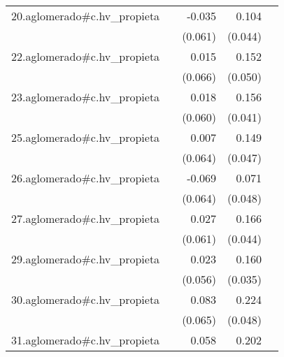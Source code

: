 {\begin{longtable}{l*{4}{D{.}{.}{-1}}}
\addlinespace
20.aglomerado#c.hv\_propieta&                     &      -0.035         &       0.104\sym{*}  &                     \\
            &                     &     (0.061)         &     (0.044)         &                     \\
\addlinespace
22.aglomerado#c.hv\_propieta&                     &       0.015         &       0.152\sym{**} &                     \\
            &                     &     (0.066)         &     (0.050)         &                     \\
\addlinespace
23.aglomerado#c.hv\_propieta&                     &       0.018         &       0.156\sym{***}&                     \\
            &                     &     (0.060)         &     (0.041)         &                     \\
\addlinespace
25.aglomerado#c.hv\_propieta&                     &       0.007         &       0.149\sym{**} &                     \\
            &                     &     (0.064)         &     (0.047)         &                     \\
\addlinespace
26.aglomerado#c.hv\_propieta&                     &      -0.069         &       0.071         &                     \\
            &                     &     (0.064)         &     (0.048)         &                     \\
\addlinespace
27.aglomerado#c.hv\_propieta&                     &       0.027         &       0.166\sym{***}&                     \\
            &                     &     (0.061)         &     (0.044)         &                     \\
\addlinespace
29.aglomerado#c.hv\_propieta&                     &       0.023         &       0.160\sym{***}&                     \\
            &                     &     (0.056)         &     (0.035)         &                     \\
\addlinespace
30.aglomerado#c.hv\_propieta&                     &       0.083         &       0.224\sym{***}&                     \\
            &                     &     (0.065)         &     (0.048)         &                     \\
\addlinespace
31.aglomerado#c.hv\_propieta&                     &       0.058         &       0.202\sym{***}&                     \\

\end{longtable}}

